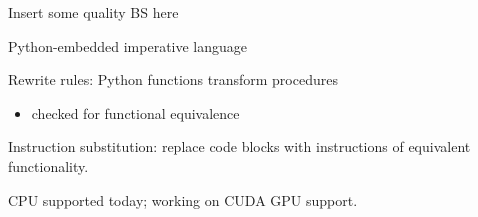 {\LARGE

Insert some quality BS here


}


\newpage
{}

{\LARGE
Python-embedded imperative language

Rewrite rules: Python functions transform procedures
\begin{itemize}
  \item checked for functional equivalence
\end{itemize}

Instruction substitution: replace code blocks with instructions of equivalent functionality.

CPU supported today; working on CUDA GPU support.
}

\newpage
{}

{\large

}

\newpage
{}

{\large

}

\newpage
{}

{\large

}

\newpage
{}

{\large

}

\newpage
{}

{\large

}

\newpage
{}

{\large

}

\newpage
{}

{\large

}

\newpage
{}

{\large

}

\newpage
{}

{\large

}

\newpage
{}

